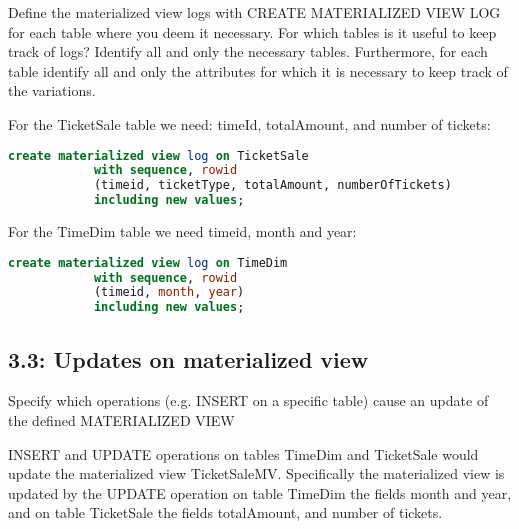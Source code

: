 \begin{question}
    Define the materialized view logs with CREATE MATERIALIZED VIEW LOG for
each table where you deem it necessary. For which tables is it useful to keep track
of logs? Identify all and only the necessary tables. Furthermore, for each table
identify all and only the attributes for which it is necessary to keep track of the
variations.
\end{question}

\begin{answer}
    For the TicketSale table we need: timeId, totalAmount, and number of tickets:
    \begin{lstlisting}[language = SQL]
        create materialized view log on TicketSale
            with sequence, rowid
            (timeid, ticketType, totalAmount, numberOfTickets)
            including new values;
    \end{lstlisting}
    For the TimeDim table we need timeid, month and year:
    \begin{lstlisting}[language = SQL]
        create materialized view log on TimeDim
            with sequence, rowid
            (timeid, month, year)
            including new values;
    \end{lstlisting}
\end{answer}

\subsection{3.3: Updates on materialized view}
\begin{question}
    Specify which operations (e.g. INSERT on a specific table) cause an update of
the defined MATERIALIZED VIEW
\end{question}

\begin{answer}
    INSERT and UPDATE operations on tables TimeDim and TicketSale would update the materialized view TicketSaleMV.
    Specifically the materialized view is updated by the UPDATE operation on table TimeDim the fields month and year,
    and on table TicketSale the fields totalAmount, and number of tickets.
\end{answer}

\pagebreak